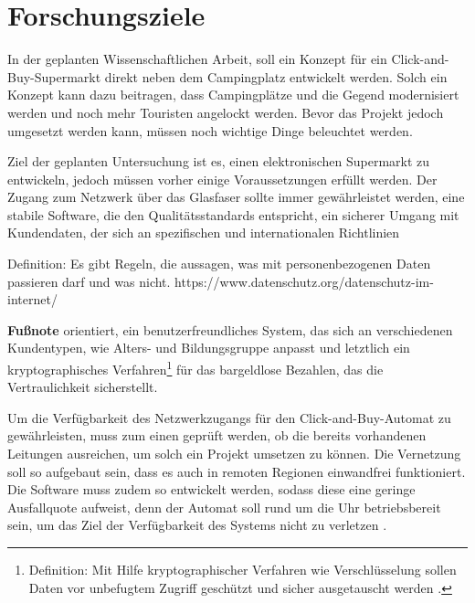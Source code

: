 \section{Forschungsziele}


In der geplanten Wissenschaftlichen Arbeit, soll ein Konzept für ein Click-and-Buy-Supermarkt direkt neben
dem Campingplatz entwickelt werden. Solch ein Konzept kann dazu beitragen, dass Campingplätze und die Gegend
modernisiert werden und noch mehr Touristen angelockt werden. Bevor das Projekt jedoch umgesetzt werden kann, 
müssen noch wichtige Dinge beleuchtet werden. 


Ziel der geplanten Untersuchung ist es, einen elektronischen Supermarkt zu entwickeln, jedoch müssen vorher 
einige Voraussetzungen erfüllt werden. Der Zugang zum Netzwerk über das Glasfaser sollte immer gewährleistet
werden, eine stabile Software, die den Qualitätsstandards entspricht, ein sicherer Umgang mit Kundendaten, 
der sich an spezifischen und internationalen Richtlinien 

Definition: Es gibt Regeln, die aussagen, was mit personenbezogenen Daten passieren darf und was nicht.
https://www.datenschutz.org/datenschutz-im-internet/

\textbf{Fußnote} orientiert, ein benutzerfreundliches
System, das sich an verschiedenen Kundentypen, wie Alters- und Bildungsgruppe anpasst und letztlich ein 
kryptographisches Verfahren\footnote{Definition: Mit Hilfe kryptographischer Verfahren wie Verschlüsselung sollen
Daten vor unbefugtem Zugriff geschützt und sicher ausgetauscht werden \cite{refart:SLWK}.} für das bargeldlose 
Bezahlen, das die Vertraulichkeit sicherstellt.


Um die Verfügbarkeit des Netzwerkzugangs für den Click-and-Buy-Automat zu gewährleisten, muss zum einen 
geprüft werden, ob die bereits vorhandenen Leitungen ausreichen, um solch ein Projekt umsetzen zu können.
Die Vernetzung soll so aufgebaut sein, dass es auch in remoten Regionen einwandfrei funktioniert. 
Die Software muss zudem so entwickelt werden, sodass diese eine geringe Ausfallquote aufweist, 
denn der Automat soll rund um die Uhr betriebsbereit sein, um das Ziel der Verfügbarkeit des
Systems nicht zu verletzen \cite{refbook:SWIS}.


